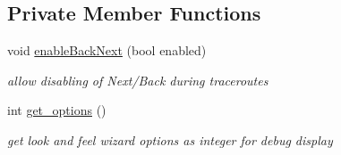 \subsection*{Private Member Functions}
\begin{CompactItemize}
\item 
void \hyperlink{classIXmapsWizard_142598b5e0943b66b8817cc7da82c979}{enableBackNext} (bool enabled)
\begin{CompactList}\small\item\em allow disabling of Next/Back during traceroutes \item\end{CompactList}\item 
\hypertarget{classIXmapsWizard_51affaede8e7b78b01266b5ec95371f2}{
int \hyperlink{classIXmapsWizard_51affaede8e7b78b01266b5ec95371f2}{get\_\-options} ()}
\label{classIXmapsWizard_51affaede8e7b78b01266b5ec95371f2}

\begin{CompactList}\small\item\em get look and feel wizard options as integer for debug display \item\end{CompactList}\end{CompactItemize}
